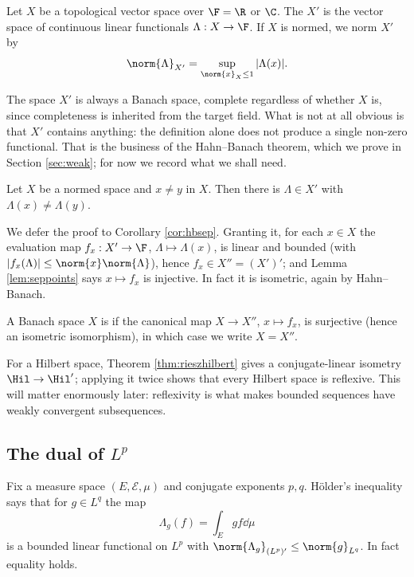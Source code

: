\begin{definition}
	Let $X$ be a topological vector space over $\F = \R$ or $\C$. The  $X'$ is the vector space of continuous linear functionals $\Lambda : X \to \F$. If $X$ is normed, we norm $X'$ by
	$$\norm{\Lambda}_{X'} = \sup_{\norm{x}_X \le 1} |\Lambda(x)|.$$
\end{definition}

The space $X'$ is always a Banach space, complete regardless of whether $X$ is, since completeness is inherited from the target field. What is not at all obvious is that $X'$ contains anything: the definition alone does not produce a single non-zero functional. That is the business of the Hahn--Banach theorem, which we prove in Section \ref{sec:weak}; for now we record what we shall need.

\begin{lemma}\label{lem:seppoints}
	Let $X$ be a normed space and $x \ne y$ in $X$. Then there is $\Lambda \in X'$ with $\Lambda(x) \ne \Lambda(y)$.
\end{lemma}

We defer the proof to Corollary \ref{cor:hbsep}. Granting it, for each $x \in X$ the evaluation map $f_x : X' \to \F$, $\Lambda \mapsto \Lambda(x)$, is linear and bounded (with $|f_x(\Lambda)| \le \norm{x}\norm{\Lambda}$), hence $f_x \in X'' = (X')'$; and Lemma \ref{lem:seppoints} says $x \mapsto f_x$ is injective. In fact it is isometric, again by Hahn--Banach.

\begin{definition}[Reflexive]
	A Banach space $X$ is  if the canonical map $X \to X''$, $x \mapsto f_x$, is surjective (hence an isometric isomorphism), in which case we write $X = X''$.
\end{definition}

For a Hilbert space, Theorem \ref{thm:rieszhilbert} gives a conjugate-linear isometry $\Hil \to \Hil'$; applying it twice shows that every Hilbert space is reflexive. This will matter enormously later: reflexivity is what makes bounded sequences have weakly convergent subsequences.

\subsection{The dual of \texorpdfstring{$L^p$}{Lp}}

Fix a measure space $(E,\mathcal{E},\mu)$ and conjugate exponents $p,q$. H\"older's inequality says that for $g \in L^q$ the map
$$\Lambda_g(f) = \int_E gf \dd \mu$$
is a bounded linear functional on $L^p$ with $\norm{\Lambda_g}_{(L^p)'} \le \norm{g}_{L^q}$. In fact equality holds.


